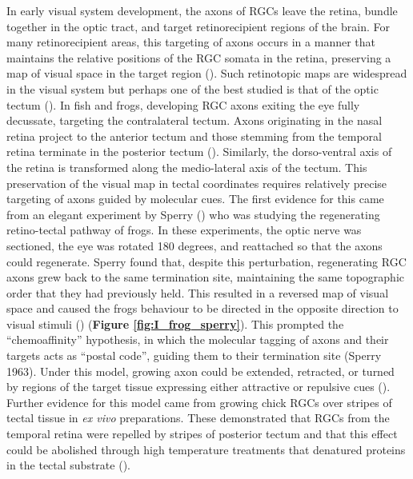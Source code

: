 In early visual system development, the axons of RGCs leave the retina, bundle together in the optic tract, and target retinorecipient regions of the brain. For many retinorecipient areas, this targeting of axons occurs in a manner that maintains the relative positions of the RGC somata in the retina, preserving a map of visual space in the target region (\cite{Luo2007DevelopmentMaps., Huberman2008MechanismsFields}). Such retinotopic maps are widespread in the visual system but perhaps one of the best studied is that of the optic tectum (\cite{Goodhill2005}). In fish and frogs, developing RGC axons exiting the eye fully decussate, targeting the contralateral tectum.  Axons originating in the nasal retina project to the anterior tectum and those stemming from the temporal retina terminate in the posterior tectum (\cite{Attardi1963PreferentialFibers}). Similarly, the dorso-ventral axis of the retina is transformed along the medio-lateral axis of the tectum. This preservation of the visual map in tectal coordinates requires relatively precise targeting of axons guided by molecular cues. The first evidence for this came from an elegant experiment by Sperry (\citeyear{Sperry1963CHEMOAFFINITYPATTERNS}) who was studying the regenerating retino-tectal pathway of frogs. In these experiments, the optic nerve was sectioned, the eye was rotated 180 degrees, and reattached so that the axons could regenerate. Sperry found that, despite this perturbation, regenerating RGC axons grew back to the same termination site, maintaining the same topographic order that they had previously held. This resulted in a reversed map of visual space and caused the frogs behaviour to be directed in the opposite direction to visual stimuli (\cite{Sperry1943EffectCoordination, Sperry1963CHEMOAFFINITYPATTERNS}) (\textbf{Figure \ref{fig:I_frog_sperry}}). This prompted the “chemoaffinity” hypothesis, in which the molecular tagging of axons and their targets acts as  “postal code”, guiding them to their termination site (Sperry 1963). Under this model, growing axon could be extended, retracted, or turned by regions of the target tissue expressing either attractive or repulsive cues (\cite{Meyer1998RogerHypothesis}). Further evidence for this model came from growing chick RGCs over stripes of tectal tissue in \textit{ex vivo} preparations. These demonstrated that RGCs from the temporal retina were repelled by stripes of posterior tectum and that this effect could be abolished through high temperature treatments that denatured proteins in the tectal substrate (\cite{Walter1987RecognitionVitro}).

